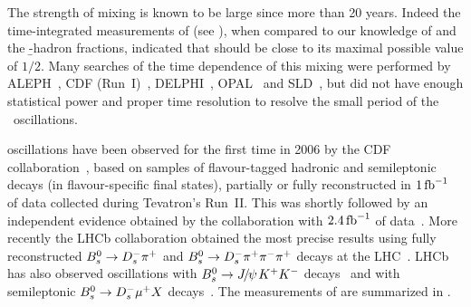  

 


The strength of \Bs mixing is known to be large since more than 20 years. 
Indeed the time-integrated measurements of \chibar (see ),
when compared to our knowledge
of \chid and the \b-hadron fractions, indicated that 
\chis should be close to its maximal possible value of $1/2$.
Many searches of the time dependence of this mixing 
were performed by ALEPH~\cite{Heister:2002gk},
CDF (Run~I)~\cite{Abe:1998qj},
DELPHI~\cite{Abreu:2000sh,Abreu:2000ev,Abdallah:2002mr,Abdallah:2003we},
OPAL~\cite{Abbiendi:1999gm,Abbiendi:2000bh} and
SLD~\cite{Abe:2002ua,Abe:2002wfa,Abe:2000gp},
but did not have enough statistical power
and proper time resolution to resolve 
the small period of the \Bs\ oscillations.

\Bs oscillations have been observed for the first time in 2006
by the CDF collaboration~\cite{Abulencia:2006ze,*Abulencia:2006mq_mod_cont},
based on samples of flavour-tagged hadronic and semileptonic \Bs decays
(in flavour-specific final states), partially or fully reconstructed in 
$1\mbox{\,fb}^{-1}$ of data collected during Tevatron's Run~II. 
This was shortly followed by an independent evidence obtained by the \dzero collaboration
with $2.4\mbox{\,fb}^{-1}$ of
data~\cite{D0note5618:2008,*D0note5474:2007,*D0note5254:2006,*Abazov:2006dm_mod_cont}.
More recently the LHCb collaboration obtained the most precise results using fully reconstructed 
$B^0_s \to D_s^-\pi^+$ and $B^0_s \to D_s^-\pi^+\pi^-\pi^+$ decays at the 
LHC~\cite{Aaij:2011qx,Aaij:2013mpa}.
LHCb has also observed \Bs oscillations with 
$B^0_s\to{J\mskip -3mu/\mskip -2mu\psi\mskip 2mu} K^+K^-$ decays~\cite{LHCB-PAPER-2014-059,*Aaij:2013oba_supersede2}
and with semileptonic $B^0_s \to D_s^-\mu^+ X$ decays~\cite{Aaij:2013gja}.
The measurements of \dms are summarized in . 

